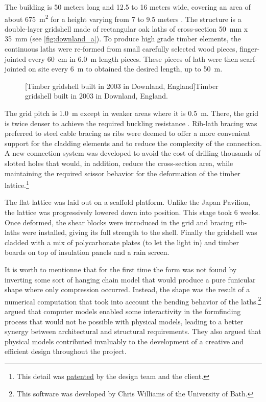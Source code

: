 The building is 50 meters long and 12.5 to 16 meters wide, covering an area of about \SI{675}{m^2} for a height varying from 7 to 9.5 meters \cite{Harris2002}. The structure is a double-layer gridshell made of rectangular oak laths of cross-section \SI{50}{mm} x \SI{35}{mm} (see \cref{fig:downland_a}). To produce high grade timber elements, the continuous laths were re-formed from small carefully selected wood pieces, finger-jointed every \SI{60}{cm} in \SI{6.0}{m} length pieces. These pieces of lath were then scarf-jointed on site every \SI{6}{m} to obtained the desired length, up to \SI{50}{m}.
 \begin{figure}[h]
		\hspace*{\fill}
		\vspace{10pt}
		[Timber gridshell built in 2003 in Downland, England]{Timber gridshell built in 2003 in Downland, England.}
		\label{fig:downland} 
\end{figure}

The grid pitch is \SI{1.0}{m} except in weaker areas where it is \SI{0.5}{m}. There, the grid is twice denser to achieve the required buckling resistance \cite{Harris2003}. Rib-lath bracing was preferred to steel cable bracing as ribs were deemed to offer a more convenient support for the cladding elements and to reduce the complexity of the connection. A new connection system was developed to avoid the cost of drilling thousands of slotted holes that would, in addition, reduce the cross-section area, while maintaining the required scissor behavior for the deformation of the timber lattice.\footnote{This detail was \href{https://patents.google.com/patent/GB2361504A/en?q=\%22A+coupling+and+a+method+of+constructing+grid+shell+buildings+using+such+a+coupling\%22&country=GB}{patented} by the design team and the client.}

The flat lattice was laid out on a scaffold platform. Unlike the Japan Pavilion, the lattice was progressively lowered down into position. This stage took 6 weeks. Once deformed, the shear blocks were introduced in the grid and bracing rib-laths were installed, giving its full strength to the shell. Finally the gridshell was cladded with a mix of polycarbonate plates (to let the light in) and timber boards on top of insulation panels and a rain screen.

It is worth to mentionne that for the first time the form was not found by inverting some sort of hanging chain model that would produce a pure funicular shape where only compression occurred. Instead, the shape was the result of a numerical computation that took into account the bending behavior of the laths.\footnote{This software was developed by Chris Williams of the University of Bath.} \citet{Harris2003} argued that computer models enabled some interactivity in the formfinding process that would not be possible with physical models, leading to a better synergy between architectural and structural requirements. They also argued that physical models contributed invaluably to the development of a creative and efficient design throughout the project.

